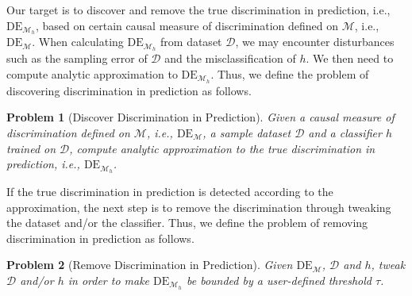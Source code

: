 \documentclass{article}
\newtheorem{problem}{Problem}
\begin{document}

Our target is to discover and remove the true discrimination in prediction, i.e., $\mathrm{DE}_{\mathcal{M}_{h}}$, based on certain causal measure of discrimination defined on $\mathcal{M}$, i.e., $\mathrm{DE}_{\mathcal{M}}$. When calculating $\mathrm{DE}_{\mathcal{M}_{h}}$ from dataset $\mathcal{D}$, we may encounter disturbances such as the sampling error of $\mathcal{D}$ and the misclassification of $h$. We then need to compute analytic approximation to $\mathrm{DE}_{\mathcal{M}_{h}}$. Thus, we define the problem of discovering discrimination in prediction as follows.

\begin{problem}[Discover Discrimination in Prediction]
Given a causal measure of discrimination defined on $\mathcal{M}$, i.e., $\mathrm{DE}_{\mathcal{M}}$, a sample dataset $\mathcal{D}$ and a classifier $h$ trained on $\mathcal{D}$, compute analytic approximation to the true discrimination in prediction, i.e., $\mathrm{DE}_{\mathcal{M}_{h}}$. %
\end{problem}

If the true discrimination in prediction is detected according to the approximation, the next step is to remove the discrimination through tweaking the dataset and/or the classifier. Thus, we define the problem of removing discrimination in prediction as follows.

\begin{problem}[Remove Discrimination in Prediction]
Given $\mathrm{DE}_{\mathcal{M}}$, $\mathcal{D}$ and $h$, tweak $\mathcal{D}$ and/or $h$ in order to make $\mathrm{DE}_{\mathcal{M}_{h}}$ be bounded by a user-defined threshold $\tau$.
\end{problem}
\end{document}
